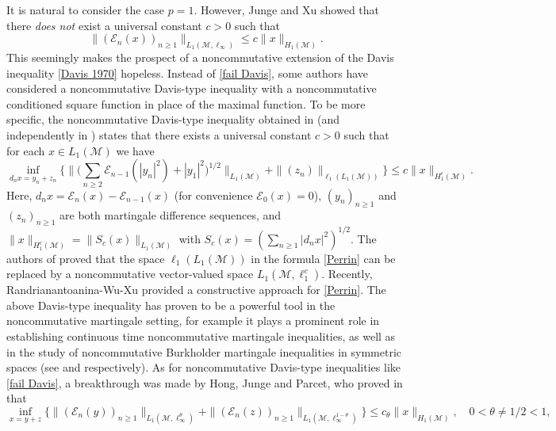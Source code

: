 \documentclass[11]{amsart}
\numberwithin{equation}{section}
\newcommand{\M}{\mathcal{M}}
\begin{document}
It is natural to consider the  case $p=1$. However, Junge and Xu \cite[Lemma 13]{JX2005} showed that there \emph{does not} exist a universal constant $c>0$ such that
\begin{equation}\label{fail Davis}
\|(\mathcal{E}_n(x))_{n\geq1}\|_{L_{1}(\mathcal{M},\ell_{\infty})}\leq c\|x\|_{H_1(\mathcal{M})}.
\end{equation}
This seemingly makes the prospect of a noncommutative extension of the Davis inequality \eqref{Davis 1970} hopeless.
Instead of \eqref{fail Davis}, some authors have considered a noncommutative Davis-type inequality with a noncommutative conditioned square function in place of the maximal function. To be more specific, the noncommutative Davis-type inequality obtained in \cite[Theorem 2.1]{Pe2009} (and independently in \cite{JM2010}) states that there exists a universal constant $c>0$ such that for each $x\in L_1(\M)$ we have
\begin{equation}\label{Perrin}
\inf_{d_nx=y_n+z_n}\Big\{	\Big\|\Big(\sum_{n\geq2}\mathcal{E}_{n-1}(|y_n|^2)+|y_1|^2\Big)^{1/2}\Big\|_{L_1(\M)}+\|(z_n)\|_{\ell_1(L_1(\M))}\Big\}\leq c	\|x\|_{H_1^c(\M)}.
\end{equation}
Here, $d_nx=\mathcal{E}_n(x)-\mathcal{E}_{n-1}(x)$ (for convenience $\mathcal{E}_0(x)=0$),  $(y_n)_{n\geq1}$ and $(z_n)_{n\geq1}$ are both martingale difference sequences, and $\|x\|_{H_1^c(\M)}=\|S_c(x)\|_{L_1(\M)}$ with $S_c(x)=(\sum_{n\geq1}|d_nx|^2)^{1/2}$. The authors of \cite{JP2014} proved that the space $\ell_1(L_1(\M))$ in the formula \eqref{Perrin} can be replaced by a noncommutative vector-valued space $L_1(\M,\ell_1^c)$. Recently, Randrianantoanina-Wu-Xu  \cite[Theorem 3.1]{RWX2019} provided a constructive approach for \eqref{Perrin}. The above Davis-type inequality has proven to be a powerful tool in the noncommutative martingale setting, for example it plays a prominent role in establishing continuous time noncommutative martingale
inequalities,  as well as in the study of noncommutative Burkholder martingale
inequalities in symmetric spaces (see \cite{JP2014} and \cite{RWX2019} respectively).
As for noncommutative Davis-type inequalities like \eqref{fail Davis}, a breakthrough was made by Hong, Junge and  Parcet, who proved in \cite[Theorem B]{HJP2016} that
\begin{equation}
	\inf_{x=y+z}\{\|(\mathcal{E}_n(y))_{n\geq1}\|_{L_1(\M,\ell_{\infty}^{\theta})}+\|(\mathcal{E}_n(z))_{n\geq1}\|_{L_1(\M,\ell_{\infty}^{1-\theta})}\}\leq c_{\theta}\|x\|_{H_1(\M)}, \quad 0<\theta\neq 1/2<1,
\end{equation}
\end{document}
